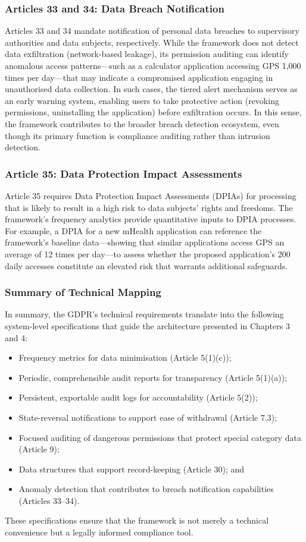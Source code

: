 \subsubsection{Articles 33 and 34: Data Breach Notification}
Articles 33 and 34 mandate notification of personal data breaches to supervisory authorities and data subjects, respectively. While the framework does not detect data exfiltration (network-based leakage), its permission auditing can identify anomalous access patterns—such as a calculator application accessing GPS 1,000 times per day—that may indicate a compromised application engaging in unauthorised data collection. In such cases, the tiered alert mechanism serves as an early warning system, enabling users to take protective action (revoking permissions, uninstalling the application) before exfiltration occurs. In this sense, the framework contributes to the broader breach detection ecosystem, even though its primary function is compliance auditing rather than intrusion detection.

\subsubsection{Article 35: Data Protection Impact Assessments}
Article 35 requires Data Protection Impact Assessments (DPIAs) for processing that is likely to result in a high risk to data subjects' rights and freedoms. The framework's frequency analytics provide quantitative inputs to DPIA processes. For example, a DPIA for a new mHealth application can reference the framework's baseline data—showing that similar applications access GPS an average of 12 times per day—to assess whether the proposed application's 200 daily accesses constitute an elevated risk that warrants additional safeguards.

\subsubsection{Summary of Technical Mapping}
In summary, the GDPR's technical requirements translate into the following system-level specifications that guide the architecture presented in Chapters 3 and 4:
\begin{itemize}
    \item Frequency metrics for data minimisation (Article 5(1)(c));
    \item Periodic, comprehensible audit reports for transparency (Article 5(1)(a));
    \item Persistent, exportable audit logs for accountability (Article 5(2));
    \item State-reversal notifications to support ease of withdrawal (Article 7.3);
    \item Focused auditing of dangerous permissions that protect special category data (Article 9);
    \item Data structures that support record-keeping (Article 30); and
    \item Anomaly detection that contributes to breach notification capabilities (Articles 33–34).
\end{itemize}
These specifications ensure that the framework is not merely a technical convenience but a legally informed compliance tool.


